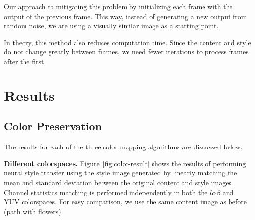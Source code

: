 \documentclass[10pt,twocolumn,letterpaper]{article}
\begin{document}
Our approach to mitigating this problem by initializing each frame with the output of the previous frame. This way, instead of generating a new output from random noise, we are using a visually similar image as a starting point.

In theory, this method also reduces computation time. Since the content and style do not change greatly between frames, we need fewer iterations to process frames after the first.

\section{Results}
\subsection{Color Preservation}
The results for each of the three color mapping algorithms are discussed below.

\bigbreak\noindent\textbf{Different colorspaces.}
Figure~\ref{fig:color-result} shows the results of performing neural style transfer using the style image generated by linearly matching the mean and standard deviation between the original content and style images. Channel statistics matching is performed independently in both the $l\alpha\beta$ and YUV colorspaces. For easy comparison, we use the same content image as before (path with flowers).
\end{document}
